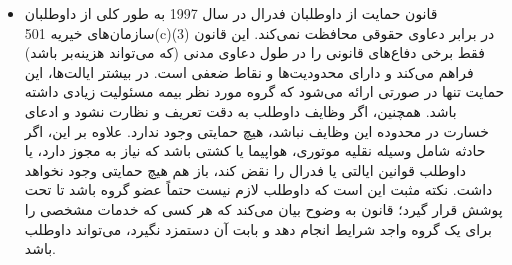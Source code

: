 \begin{itemize}
\item
قانون حمایت از داوطلبان فدرال در سال 1997 به طور کلی از داوطلبان سازمان‌های خیریه 501(c)(3) در برابر دعاوی حقوقی محافظت نمی‌کند. این قانون فقط برخی دفاع‌های قانونی را در طول دعاوی مدنی (که می‌تواند هزینه‌بر باشد) فراهم می‌کند و دارای محدودیت‌ها و نقاط ضعفی است. در بیشتر ایالت‌ها، این حمایت تنها در صورتی ارائه می‌شود که گروه مورد نظر بیمه مسئولیت زیادی داشته باشد. همچنین، اگر وظایف داوطلب به دقت تعریف و نظارت نشود و ادعای خسارت در محدوده این وظایف نباشد، هیچ حمایتی وجود ندارد. علاوه بر این، اگر حادثه شامل وسیله نقلیه موتوری، هواپیما یا کشتی باشد که نیاز به مجوز دارد، یا داوطلب قوانین ایالتی یا فدرال را نقض کند، باز هم هیچ حمایتی وجود نخواهد داشت. نکته مثبت این است که داوطلب لازم نیست حتماً عضو گروه باشد تا تحت پوشش قرار گیرد؛ قانون به وضوح بیان می‌کند که هر کسی که خدمات مشخصی را برای یک گروه واجد شرایط انجام دهد و بابت آن دستمزد نگیرد، می‌تواند داوطلب باشد.


\end{itemize}

